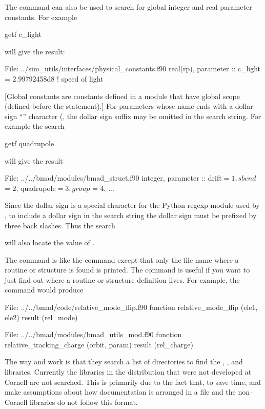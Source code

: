 {{{{{{The  command can also be used to search for global integer and real parameter constants. For example
\begin{example}
  getf c_light
\end{example}
will give the result:
\begin{example}
  File: ../sim_utils/interfaces/physical_constants.f90
      real(rp), parameter :: c_light = 2.99792458d8              ! speed of light
\end{example}
[Global constants are constants defined in a module that have global scope (defined before the
 statement).] For parameters whose name ends with a dollar sign ``\vn{\$}'' character
(, the dollar sign suffix may be omitted in the search string. For example
the search
\begin{example}
  getf quadrupole
\end{example}
will give the result
\begin{example}
  File: ../../bmad/modules/bmad_struct.f90
      integer, parameter :: drift$ = 1, sbend$ = 2, quadrupole$ = 3, group$ = 4, ...
\end{example}
Since the dollar sign is a special character for the Python regexp module used by , to
include a dollar sign in the search string the dollar sign must be prefixed by three back
slashes. Thus the search
will also locate the value of .

The  command is like the  command except that only
the file name where a routine or structure is found is printed.
The  command is useful if you
want to just find out where a routine or structure definition lives.
For example, the  command would produce
\begin{example}
  File: ../../bmad/code/relative_mode_flip.f90
      function relative_mode_flip (ele1, ele2) result (rel_mode)

  File: ../../bmad/modules/bmad_utils_mod.f90
      function relative_tracking_charge (orbit, param) result (rel_charge)
\end{example}

The way  and  work is that they search a list of
directories to find the , , and 
libraries. Currently the libraries in the \bmad distribution that were
not developed at Cornell are not searched. This is primarily due to
the fact that, to save time,  and  make assumptions
about how documentation is arranged in a file and the non--Cornell libraries 
do not follow this format.

}}}}}}
